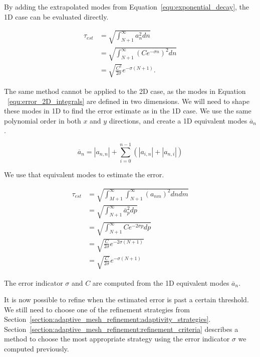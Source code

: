 By adding the extrapolated modes from Equation~\ref{equ:exponential_decay}, the 1D case can be
evaluated directly.

\begin{equation}
	\begin{aligned}
		\tau_{est} &= \sqrt{\int_{N + 1}^{\infty } a_n^2 dn} \\
		&= \sqrt{\int_{N + 1}^{\infty } \left ( Ce^{-\sigma n} \right )^2 dn} \\
		&= \sqrt{\frac{C^2}{2\sigma }}e^{-\sigma (N + 1)}. 
	\end{aligned}
\end{equation}

The same method cannot be applied to the 2D case, as the modes in Equation
~\ref{equ:error_2D_integrals} are defined in two dimensions. We will need to shape these modes in 1D
to find the error estimate as in the 1D case. We use the same polynomial order in both $x$ and $y$
directions, and create a 1D equivalent modes $\overline{a}_n$.

\begin{equation}
	\overline{a}_n = \left| a_{n,n} \right| + \sum_{i = 0}^{n-1} \left( \left| a_{i, n} \right| + \left| a_{n, i} \right| \right)
\end{equation}

We use that equivalent modes to estimate the error.

\begin{equation}
	\begin{aligned}
		\tau_{est} &= \sqrt{\int_{M+1}^{\infty }\int_{N + 1 }^{\infty}(a_{nm})^2 dn dm} \\
		&= \sqrt{\int_{N + 1}^{\infty }\overline{a}_p^2 dp} \\
		&= \sqrt{\int_{N + 1}^{\infty} Ce^{-2\sigma p}dp} \\
		&= \sqrt{\frac{C}{2\sigma}e^{-2\sigma(N + 1)}} \\
		&= \sqrt{\frac{C}{2\sigma}} e^{-\sigma (N + 1)}
	\end{aligned}
\end{equation}

The error indicator $\sigma$ and $C$ are computed from the 1D equivalent modes $\overline{a}_n$.

It is now possible to refine when the estimated error is past a certain threshold. We still need to
choose one of the refinement strategies from
Section~\ref{section:adaptive_mesh_refinement:adaptivity_strategies}.
Section~\ref{section:adaptive_mesh_refinement:refinement_criteria} describes a method to choose the
most appropriate strategy using the error indicator $\sigma$ we computed previously.

